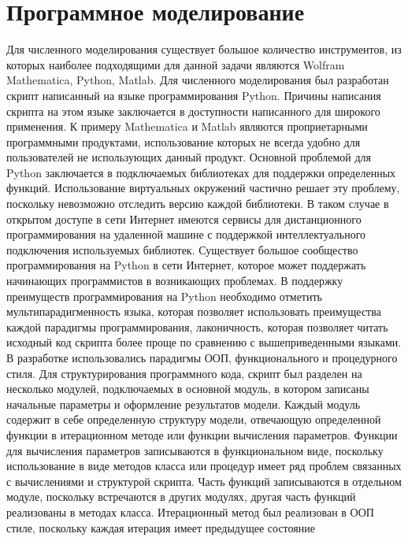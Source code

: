 \section{Программное моделирование}

Для численного моделирования существует большое количество инструментов, из которых наиболее подходящими
для данной задачи являются Wolfram Mathematica, Python, Matlab.
Для численного моделирования был разработан скрипт написанный на языке программирования Python.
Причины написания скрипта на этом языке заключается в доступности написанного для широкого применения.
К примеру Mathematica и Matlab являются проприетарными программными продуктами, использование которых
не всегда удобно для пользователей не использующих данный продукт.
Основной проблемой для Python заключается в подключаемых библиотеках для поддержки определенных функций.
Использование виртуальных окружений частично решает эту проблему, поскольку невозможно отследить версию
каждой библиотеки.
В таком случае в открытом доступе в сети Интернет имеются сервисы для дистанционного программирования на
удаленной машине с поддержкой интеллектуального подключения используемых библиотек.
Существует большое сообщество программирования на Python в сети Интернет, которое может поддержать
начинающих программистов в возникающих проблемах.
В поддержку преимуществ программирования на Python необходимо отметить мультипарадигменность языка,
которая позволяет использовать преимущества каждой парадигмы программирования, лаконичность, которая
позволяет читать исходный код скрипта более проще по сравнению с вышеприведенными языками.
В разработке использовались парадигмы ООП, функционального и процедурного стиля.
Для структурирования программного кода, скрипт был разделен на несколько модулей, подключаемых в основной
модуль, в котором записаны начальные параметры и оформление результатов модели.
Каждый модуль содержит в себе определенную структуру модели, отвечающую определенной функции в итерационном
методе или функции вычисления параметров.
Функции для вычисления параметров записываются в функциональном виде, поскольку использование в виде
методов класса или процедур имеет ряд проблем связанных с вычислениями и структурой скрипта.
Часть функций записываются в отдельном модуле, поскольку встречаются в других модулях, другая часть
функций реализованы в методах класса.
Итерационный метод был реализован в ООП стиле, поскольку каждая итерация имеет предыдущее состояние
